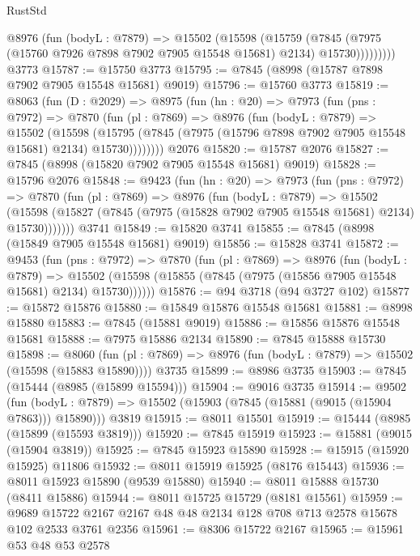 \begin{lexlean}{RustStd}
\begin{coremodule}
            @8976
              (fun (bodyL : @7879) =>
              @15502
                (@15598
                  (@15759
                    (@7845
                      (@7975 (@15760 @7926 @7898 @7902 @7905 @15548 @15681) @2134)
                      @15730)))))))))
    @3773
@15787 := @15750 @3773
@15795 := @7845 (@8998 (@15787 @7898 @7902 @7905 @15548 @15681) @9019)
@15796 := @15760 @3773
@15819 := @8063
    (fun (D : @2029) =>
    @8975
      (fun (hn : @20) =>
      @7973
        (fun (pns : @7972) =>
        @7870
          (fun (pl : @7869) =>
          @8976
            (fun (bodyL : @7879) =>
            @15502
              (@15598
                (@15795 (@7845 (@7975 (@15796 @7898 @7902 @7905 @15548 @15681) @2134) @15730))))))))
    @2076
@15820 := @15787 @2076
@15827 := @7845 (@8998 (@15820 @7902 @7905 @15548 @15681) @9019)
@15828 := @15796 @2076
@15848 := @9423
    (fun (hn : @20) =>
    @7973
      (fun (pns : @7972) =>
      @7870
        (fun (pl : @7869) =>
        @8976
          (fun (bodyL : @7879) =>
          @15502
            (@15598 (@15827 (@7845 (@7975 (@15828 @7902 @7905 @15548 @15681) @2134) @15730)))))))
    @3741
@15849 := @15820 @3741
@15855 := @7845 (@8998 (@15849 @7905 @15548 @15681) @9019)
@15856 := @15828 @3741
@15872 := @9453
    (fun (pns : @7972) =>
    @7870
      (fun (pl : @7869) =>
      @8976
        (fun (bodyL : @7879) =>
        @15502 (@15598 (@15855 (@7845 (@7975 (@15856 @7905 @15548 @15681) @2134) @15730))))))
@15876 := @94 @3718 (@94 @3727 @102)
@15877 := @15872 @15876
@15880 := @15849 @15876 @15548 @15681
@15881 := @8998 @15880
@15883 := @7845 (@15881 @9019)
@15886 := @15856 @15876 @15548 @15681
@15888 := @7975 @15886 @2134
@15890 := @7845 @15888 @15730
@15898 := @8060
    (fun (pl : @7869) => @8976 (fun (bodyL : @7879) => @15502 (@15598 (@15883 @15890))))
    @3735
@15899 := @8986 @3735
@15903 := @7845 (@15444 (@8985 (@15899 @15594)))
@15904 := @9016 @3735
@15914 := @9502
    (fun (bodyL : @7879) => @15502 (@15903 (@7845 (@15881 (@9015 (@15904 @7863))) @15890)))
    @3819
@15915 := @8011 @15501
@15919 := @15444 (@8985 (@15899 (@15593 @3819)))
@15920 := @7845 @15919
@15923 := @15881 (@9015 (@15904 @3819))
@15925 := @7845 @15923 @15890
@15928 := @15915 (@15920 @15925) @11806
@15932 := @8011 @15919 @15925 (@8176 @15443)
@15936 := @8011 @15923 @15890 (@9539 @15880)
@15940 := @8011 @15888 @15730 (@8411 @15886)
@15944 := @8011 @15725 @15729 (@8181 @15561)
@15959 := @9689 @15722 @2167 @2167 @48 @48 @2134 @128 @708 @713 @2578 @15678 @102 @2533 @3761 @2356
@15961 := @8306 @15722 @2167
@15965 := @15961 @53 @48 @53 @2578

\end{coremodule}
\end{lexlean}
